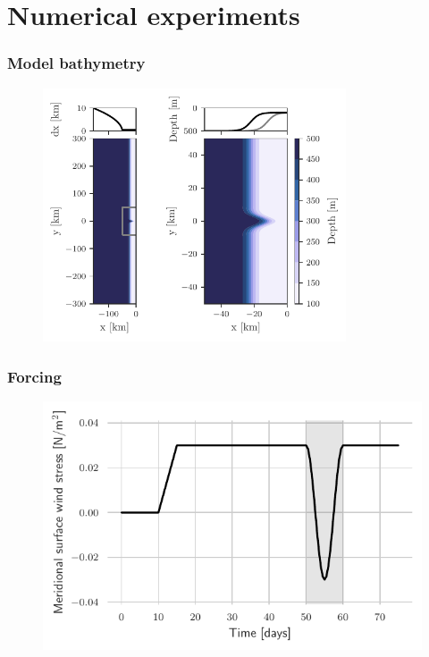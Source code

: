 \documentclass{beamer}
\begin{document}
\section{Numerical experiments}
\begin{frame}
\frametitle{Model bathymetry}
\begin{figure}
\centering
\includegraphics[clip, trim=0 0 0 0.3cm, width=0.8\textwidth]{figures/bathymetry.pdf}
\end{figure}
\end{frame}


\begin{frame}
\frametitle{Forcing}
\begin{figure}
\centering
\includegraphics{figures/forcing.pdf}
\end{figure}
\end{frame}
\end{document}
